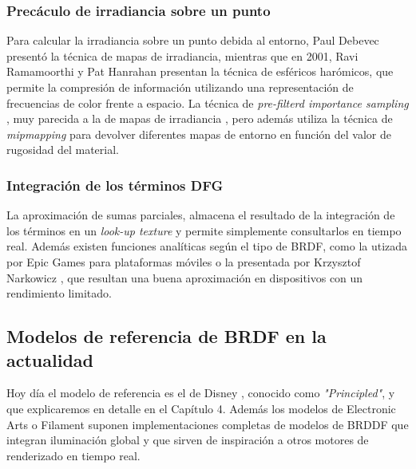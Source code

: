             \subsubsection*{\hspace*{1.5em}Prec\'aculo de irradiancia sobre un punto}
            Para calcular la irradiancia sobre un punto debida al entorno, Paul Debevec \autocite{debevec} present\'o la t\'ecnica
            de mapas de irradiancia, mientras que en 2001, Ravi Ramamoorthi y Pat Hanrahan \autocite{sh} presentan la t\'ecnica de esf\'ericos har\'omicos,
            que permite la compresi\'on de informaci\'on utilizando una representaci\'on de frecuencias de color frente a espacio.
            La t\'ecnica de \textit{pre-filterd importance sampling} \autocite{prefilteredimportancesampling}, muy parecida a la de mapas
            de irradiancia \autocite{debevec}, pero adem\'as utiliza la t\'ecnica de \textit{mipmapping} para devolver diferentes mapas
            de entorno en funci\'on del valor de rugosidad del material.

            \subsubsection*{\hspace*{1.5em}Integraci\'on de los t\'erminos DFG}
            La aproximaci\'on de sumas parciales, \autocite{karis} almacena el resultado de la integraci\'on de los t\'erminos en un \textit{look-up texture}
            y permite simplemente consultarlos en tiempo real. Adem\'as existen funciones anal\'iticas seg\'un el tipo de BRDF,
            como la utizada por Epic Games \autocite{dfgapproximation} para plataformas m\'oviles o la presentada por Krzysztof Narkowicz
            \autocite{narkowicz}, que resultan una buena aproximaci\'on en dispositivos con un rendimiento limitado.

        \subsection{Modelos de referencia de BRDF en la actualidad}
        Hoy d\'ia el modelo de referencia es el de Disney \autocite{disney12} \autocite{disney15}, conocido como \textit{"Principled"},
        y que explicaremos en detalle en el Cap\'itulo 4. Adem\'as los modelos de Electronic Arts \autocite{frostbite} o Filament \autocite{filament}
        suponen implementaciones completas de modelos de BRDDF que integran iluminaci\'on global y  que sirven de inspiraci\'on a otros
        motores de renderizado en tiempo real.
